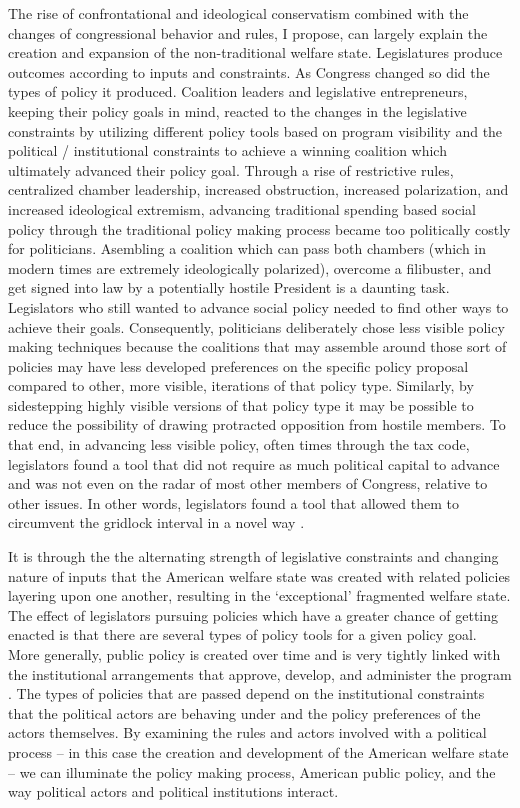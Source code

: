 \documentclass[12pt]{article}
\begin{document}
The rise of confrontational and ideological conservatism combined with the changes of congressional behavior and rules, I propose, can largely explain the creation and expansion of the non-traditional welfare state. Legislatures produce outcomes according to inputs and constraints. As Congress changed so did the types of policy it produced. Coalition leaders and legislative entrepreneurs, keeping their policy goals in mind, reacted to the changes in the legislative constraints by utilizing different policy tools based on program visibility and the political / institutional constraints to achieve a winning coalition which ultimately advanced their policy goal. Through a rise of restrictive rules, centralized chamber leadership, increased obstruction, increased polarization, and increased ideological extremism, advancing traditional spending based social policy through the traditional policy making process became too politically costly for politicians. Asembling a coalition which can pass both chambers (which in modern times are extremely ideologically polarized), overcome a filibuster, and get signed into law by a potentially hostile President is a daunting task. Legislators who still wanted to advance social policy needed to find other ways to achieve their goals. Consequently, politicians deliberately chose less visible policy making techniques because the coalitions that may assemble around those sort of policies may have less developed preferences on the specific policy proposal compared to other, more visible, iterations of that policy type. Similarly, by sidestepping highly visible versions of that policy type it may be possible to reduce the possibility of drawing protracted opposition from hostile members. To that end, in advancing less visible policy, often times through the tax code, legislators found a tool that did not require as much political capital to advance and was not even on the radar of most other members of Congress, relative to other issues. In other words, legislators found a tool that allowed them to circumvent the gridlock interval in a novel way \citep{krehbiel1998, binder2003}.

It is through the the alternating strength of legislative constraints and changing nature of inputs that the American welfare state was created with related policies layering upon one another, resulting in the `exceptional' fragmented welfare state. The effect of legislators pursuing policies which have a greater chance of getting enacted is that there are several types of policy tools for a given policy goal. More generally, public policy is created over time and is very tightly linked with the institutional arrangements that approve, develop, and administer the program \citep{pierson2004b}. The types of policies that are passed depend on the institutional constraints that the political actors are behaving under and the policy preferences of the actors themselves. By examining the rules and actors involved with a political process -- in this case the creation and development of the American welfare state -- we can illuminate the policy making process, American public policy, and the way political actors and political institutions interact.
\end{document}
